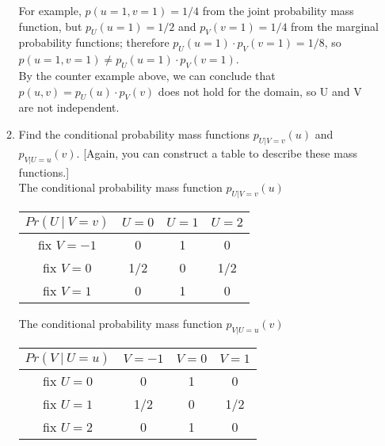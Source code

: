 \documentclass[11pt]{article}
\begin{document}
\begin{enumerate}[label=\textbf{Question \arabic*:},start=1]
\begin{enumerate}
	For example, $p(u=1, v=1) = 1/4$ from the joint probability mass function, but $p_U(u=1) = 1/2$ and $p_V(v=1) = 1/4$ from the marginal probability functions; therefore $p_U(u=1) \cdot p_V(v=1) = 1/8$, so $p(u = 1, v = 1) \neq p_U(u=1) \cdot p_V(v=1) $. \\
	
	By the counter example above, we can conclude that $p(u, v) = p_U(u) \cdot p_V(v)$ does not hold for the domain, so U and V are not independent.\\
	

	\item Find the conditional probability mass functions $p_{U|V = v}(u)$ and $p_{V|U=u}(v)$. [Again, you can construct a table to describe these mass functions.]\\
	
	The conditional probability mass function $p_{U | V=v}(u)$
\begin{center}
 \begin{tabular}{|| c c c c ||} 
 \hline
 $Pr(U\ | \ V= v)$ & $U=0$ & $U=1$ & $U=2$ \\ [0.5ex] 
 \hline\hline
 fix $V=-1$ & 0 & 1 & 0  \\ 
 \hline
 fix $V=0$ & 1/2 & 0 & 1/2  \\
 \hline
 fix $V=1$ & 0 & 1 & 0 \\
 \hline
\end{tabular}
\end{center}

	The conditional probability mass function $p_{V | U=u}(v)$
\begin{center}
 \begin{tabular}{|| c c c c ||} 
 \hline
 $Pr(V\ | \ U= u)$ & $V=-1$ & $V=0$ & $V=1$ \\ [0.5ex] 
 \hline\hline
 fix $U=0$ & 0 & 1 & 0  \\ 
 \hline
 fix $U=1$ & 1/2 & 0 & 1/2  \\
 \hline
 fix $U=2$ & 0 & 1 & 0 \\
 \hline
\end{tabular}
\end{center}

\end{enumerate}







\end{enumerate}
\end{document}
